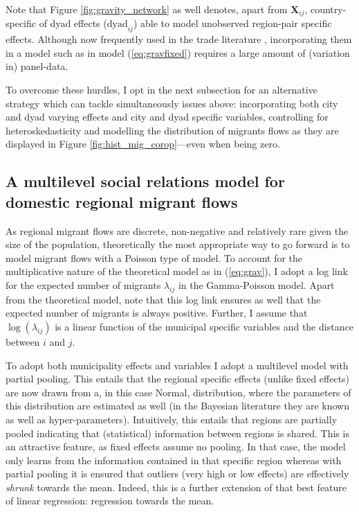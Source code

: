 \documentclass[11pt,parskip,abstracton,notitlepage, dvipsnames]{scrartcl}
\begin{document}
Note that Figure \ref{fig:gravity_network} as well denotes, apart from $\mathbf{X}_{ij}$, country-specific of dyad effects ($\text{dyad}_{ij}$) able to model unobserved region-pair specific effects. Although now frequently used in the trade literature \citep{baier2018heterogeneous, baier2019widely}, incorporating them in a model such as in model (\ref{eq:gravfixed}) requires a large amount of (variation in) panel-data.

To overcome these hurdles, I opt in the next subsection for an alternative strategy which 
can tackle simultaneously issues above: incorporating both city and dyad
varying effects and city and dyad specific variables, controlling for heteroskedasticity and modelling the distribution of migrants flows as they are displayed in Figure \ref{fig:hist_mig_corop}---even when
being zero.

\subsection{A multilevel social relations model for domestic regional migrant flows}

As regional migrant flows are discrete, non-negative and relatively
rare given the size of the population, theoretically the most appropriate way to
go forward is to model migrant flows with a Poisson type of model. To account for the multiplicative nature of the theoretical model as in
(\ref{eq:grav}), I adopt a log link for the expected number of migrants
$\lambda_{ij}$ in the Gamma-Poisson model. Apart from the theoretical model,
note that this log link ensures as well that the expected number of migrants is
always positive. Further, I assume that $\log(\lambda_{ij})$ is a linear
function of the municipal specific variables and the distance between $i$ and
$j$.

To adopt both municipality effects and variables I adopt a multilevel
model with partial pooling. This entails that the regional specific effects
(unlike fixed effects) are now drawn from a, in this case Normal, distribution,
where the parameters of this distribution are estimated as well (in the Bayesian
literature they are known as well as hyper-parameters). Intuitively, this
entails that regions are partially pooled indicating that (statistical)
information between regions is shared. This is an attractive feature, as
fixed effects assume no pooling. In that case, the model only learns from the
information contained in that specific region whereas with partial pooling
it is ensured that outliers (very high or low effects) are effectively
\emph{shrunk} towards the mean. Indeed, this is a further extension of that best
feature of linear regression: regression towards the mean.
\end{document}
